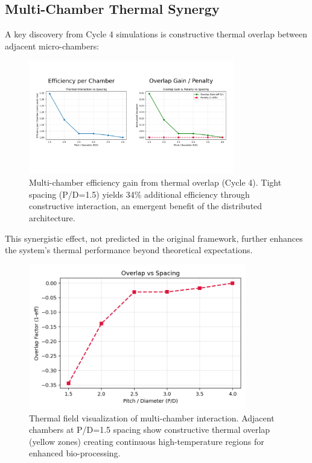 \subsection{Multi-Chamber Thermal Synergy}

A key discovery from Cycle 4 simulations is constructive thermal overlap between adjacent micro-chambers:

\begin{figure}[H]
    \centering
    \includegraphics[width=0.8\textwidth]{figures/simulations/fig_multi_chamber_DEV_CYCLE_4.png}
    \caption{Multi-chamber efficiency gain from thermal overlap (Cycle 4). Tight spacing (P/D=1.5) yields 34\% additional efficiency through constructive interaction, an emergent benefit of the distributed architecture.}
    \label{fig:multi_chamber}
\end{figure}

This synergistic effect, not predicted in the original framework, further enhances the system's thermal performance beyond theoretical expectations.

\begin{figure}[H]
    \centering
    \includegraphics[width=0.85\textwidth]{figures/simulations/multi_chamber_overlap.png}
    \caption{Thermal field visualization of multi-chamber interaction. Adjacent chambers at P/D=1.5 spacing show constructive thermal overlap (yellow zones) creating continuous high-temperature regions for enhanced bio-processing.}
    \label{fig:chamber_overlap}
\end{figure}

